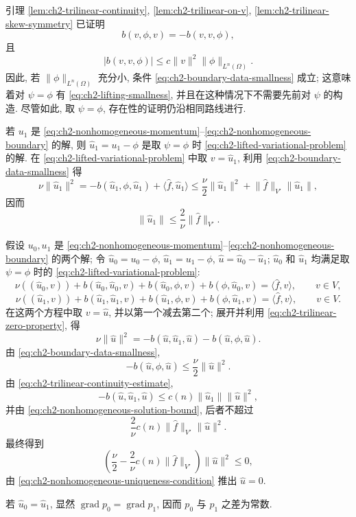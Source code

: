 \begin{Proof}
引理 \ref{lem:ch2-trilinear-continuity}, \ref{lem:ch2-trilinear-on-v}, \ref{lem:ch2-trilinear-skew-symmetry} 已证明
\[
b(v,\phi,v)=-b(v,v,\phi),
\]
且
\[
|b(v,v,\phi)|\leq c\lVert v\rVert^2\lVert\phi\rVert_{L^n(\Omega)}.
\]
因此, 若 $\lVert\phi\rVert_{L^n(\Omega)}$ 充分小, 条件 \eqref{eq:ch2-boundary-data-smallness} 成立; 这意味着对 $\psi=\phi$ 有 \eqref{eq:ch2-lifting-smallness}, 并且在这种情况下不需要先前对 $\psi$ 的构造. 尽管如此, 取 $\psi=\phi$, 存在性的证明仍沿相同路线进行.

若 $u_1$ 是 \eqref{eq:ch2-nonhomogeneous-momentum}--\eqref{eq:ch2-nonhomogeneous-boundary} 的解, 则 $\widehat u_1=u_1-\phi$ 是取 $\psi=\phi$ 时 \eqref{eq:ch2-lifted-variational-problem} 的解. 在 \eqref{eq:ch2-lifted-variational-problem} 中取 $v=\widehat u_1$, 利用 \eqref{eq:ch2-boundary-data-smallness} 得
\[
\nu\lVert\widehat u_1\rVert^2
=-b(\widehat u_1,\phi,\widehat u_1)
+\langle\widehat f,\widehat u_1\rangle
\leq\frac\nu2\lVert\widehat u_1\rVert^2
+\lVert\widehat f\rVert_{V'}\lVert\widehat u_1\rVert,
\]
因而
\begin{equation}
\lVert\widehat u_1\rVert
\leq\frac2\nu\lVert\widehat f\rVert_{V'}.
\label{eq:ch2-nonhomogeneous-solution-bound}
\end{equation}

假设 $u_0,u_1$ 是 \eqref{eq:ch2-nonhomogeneous-momentum}--\eqref{eq:ch2-nonhomogeneous-boundary} 的两个解; 令 $\widehat u_0=u_0-\phi$, $\widehat u_1=u_1-\phi$, $\widehat u=\widehat u_0-\widehat u_1$; $\widehat u_0$ 和 $\widehat u_1$ 均满足取 $\psi=\phi$ 时的 \eqref{eq:ch2-lifted-variational-problem}:
\[
\nu((\widehat u_0,v))+b(\widehat u_0,\widehat u_0,v)
+b(\widehat u_0,\phi,v)+b(\phi,\widehat u_0,v)
=\langle\widehat f,v\rangle,
\qquad v\in V,
\]
\[
\nu((\widehat u_1,v))+b(\widehat u_1,\widehat u_1,v)
+b(\widehat u_1,\phi,v)+b(\phi,\widehat u_1,v)
=\langle\widehat f,v\rangle,
\qquad v\in V.
\]
\hypertarget{chapter-02-page-136}{}
在这两个方程中取 $v=\widehat u$, 并以第一个减去第二个; 展开并利用 \eqref{eq:ch2-trilinear-zero-property}, 得
\begin{equation}
\nu\lVert\widehat u\rVert^2
=-b(\widehat u,\widehat u_1,\widehat u)
-b(\widehat u,\phi,\widehat u).
\label{eq:ch2-nonhomogeneous-difference-energy}
\end{equation}
由 \eqref{eq:ch2-boundary-data-smallness},
\[
-b(\widehat u,\phi,\widehat u)
\leq\frac\nu2\lVert\widehat u\rVert^2.
\]
由 \eqref{eq:ch2-trilinear-continuity-estimate},
\[
-b(\widehat u,\widehat u_1,\widehat u)
\leq c(n)\lVert\widehat u_1\rVert\lVert\widehat u\rVert^2,
\]
并由 \eqref{eq:ch2-nonhomogeneous-solution-bound}, 后者不超过
\[
\frac2\nu c(n)\lVert\widehat f\rVert_{V'}\lVert\widehat u\rVert^2.
\]
最终得到
\[
\left(\frac\nu2-\frac2\nu c(n)\lVert\widehat f\rVert_{V'}\right)
\lVert\widehat u\rVert^2\leq0,
\]
由 \eqref{eq:ch2-nonhomogeneous-uniqueness-condition} 推出 $\widehat u=0$.

若 $\widehat u_0=\widehat u_1$, 显然 $\operatorname{grad}p_0=\operatorname{grad}p_1$, 因而 $p_0$ 与 $p_1$ 之差为常数.
\end{Proof}

